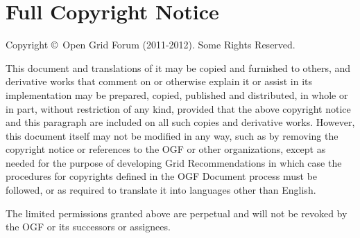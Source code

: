 \documentclass[12pt]{article}  %
\newcommand{\copyrightyears}{2011-2012}  %
\begin{document}
\section*{Full Copyright Notice}

Copyright \copyright \ Open Grid Forum (\copyrightyears). Some Rights Reserved.

This document and translations of it may be copied and furnished to others,
and derivative works that comment on or otherwise explain it or assist in its
implementation may be prepared, copied, published and distributed, in whole
or in part, without restriction of any kind, provided that the above
copyright notice and this paragraph are included on all such copies and
derivative works. However, this document itself may not be modified in any
way, such as by removing the copyright notice or references to the OGF or
other organizations, except as needed for the purpose of developing Grid
Recommendations in which case the procedures for copyrights defined in the
OGF Document process must be followed, or as required to translate it into
languages other than English.

The limited permissions granted above are perpetual and will not be revoked by the OGF or its successors or assignees.
\end{document}
